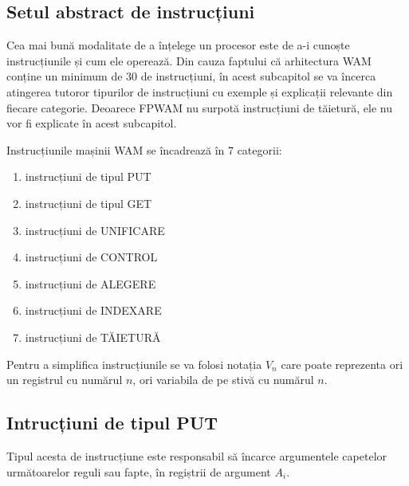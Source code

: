 \documentclass[12pt,a4paper,twoside]{report}
\begin{document}
\subsection{Setul abstract de instrucțiuni}
Cea mai bună modalitate de a înțelege un procesor este de a-i cunoște instrucțiunile și cum ele operează. Din cauza faptului că arhitectura WAM conține un minimum de 30 de instrucțiuni, în acest subcapitol se va încerca atingerea tutoror tipurilor de instrucțiuni cu exemple și explicații relevante din fiecare categorie. Deoarece FPWAM nu surpotă instrucțiuni de tăietură, ele nu vor fi explicate în acest subcapitol. 

Instrucțiunile mașinii WAM se încadrează în 7 categorii:
\begin{enumerate}
	\item instrucțiuni de tipul PUT
	\item instrucțiuni de tipul GET
	\item instrucțiuni de UNIFICARE
	\item instrucțiuni de CONTROL
	\item instrucțiuni de ALEGERE
	\item instrucțiuni de INDEXARE
	\item instrucțiuni de TĂIETURĂ
\end{enumerate}

Pentru a simplifica instrucțiunile se va folosi notația \(V_n\) care poate reprezenta ori un registrul cu numărul \(n\), ori variabila de pe stivă cu numărul \(n\).

\subsection{Intrucțiuni de tipul PUT}
Tipul acesta de instrucțiune este responsabil să încarce argumentele capetelor următoarelor reguli sau fapte, în regiștrii de argument \(A_i\).
\end{document}
